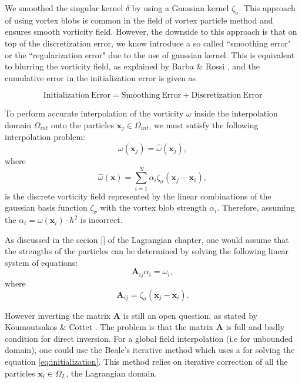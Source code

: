 We smoothed the singular kernel $\delta$ by using a Gaussian kernel $\zeta_{\sigma}$. This approach of using vortex blobs is common in the field of vortex particle method and ensures smooth vorticity field. However, the downside to this approach is that on top of the discretization error, we know introduce a so called ``smoothing error" or the ``regularization error" due to the use of gaussian kernel. This is equivalent to blurring the vorticity field, as explained by Barba \& Rossi \cite{Barba2010a}, and the cumulative error in the initialization error is given as

\begin{equation*}
\mathrm{Initialization\ Error} = \mathrm{Smoothing\  Error} + \mathrm{Discretization\ Error}
\end{equation*}

To perform accurate interpolation of the vorticity $\omega$ inside the interpolation domain $\Omega_{int}$ onto the particles $\mathbf{x}_j \in \Omega_{int}$, we must satisfy the following interpolation problem:
	\begin{equation}
	\omega(\mathbf{x}_j) = \hat{\omega}(\mathbf{x}_j),
	\end{equation}
where
	\begin{equation}
	\hat{\omega}(\mathbf{x}) = \sum_{i=1}^{N} \alpha_i \zeta_{\sigma}(\mathbf{x}_j - \mathbf{x}_i),
	\end{equation}
is the discrete vorticity field represented by the linear combinations of the gaussian basis function $\zeta_{\sigma}$ with the vortex blob strength $\alpha_i$. Therefore, assuming the $\alpha_i = \omega(\mathbf{x}_i)\cdot{h^2}$ is incorrect.

As discussed in the secion \ref{} of the Lagrangian chapter, one would assume that the strengths of the particles can be determined by solving the following linear system of equations:
\begin{equation}
\mathbf{A}_{ij}\alpha_i = \omega_i,
\end{equation}
where 
\begin{equation}
\mathbf{A}_{ij} = \zeta_{\sigma}(\mathbf{x}_j-\mathbf{x}_i).
\label{eq:initialization}
\end{equation}

However inverting the matrix $\mathbf{A}$ is still an open question, as stated by Koumoutsakos \& Cottet \cite{}. The problem is that the matrix $\mathbf{A}$ is full and badly condition for direct inversion. For a global field interpolation (i.e for unbounded domain), one could use the Beale's iterative method which uses a  for solving the equation \ref{eq:initialization}. This method relies on iterative correction of all the particles $\mathbf{x}_i \in \Omega_L$, the Lagrangian domain. 

